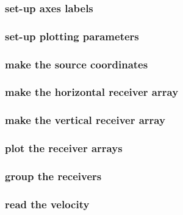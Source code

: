 \begin{frame} \frametitle{set-up axes labels}

\end{frame}
\cwpnote{}

\begin{frame} \frametitle{set-up plotting parameters}

\end{frame}
\cwpnote{}

\begin{frame} \frametitle{make the source coordinates}

\end{frame}
\cwpnote{}

\begin{frame} \frametitle{make the horizontal receiver array}

\end{frame}
\cwpnote{}

\begin{frame} \frametitle{make the vertical receiver array}

\end{frame}
\cwpnote{}

\begin{frame} \frametitle{plot the receiver arrays}

\end{frame}
\cwpnote{}

\begin{frame}  \end{frame}

\begin{frame} \frametitle{group the receivers}

\end{frame}
\cwpnote{}

\begin{frame} \frametitle{read the velocity}

\end{frame}
\cwpnote{}

